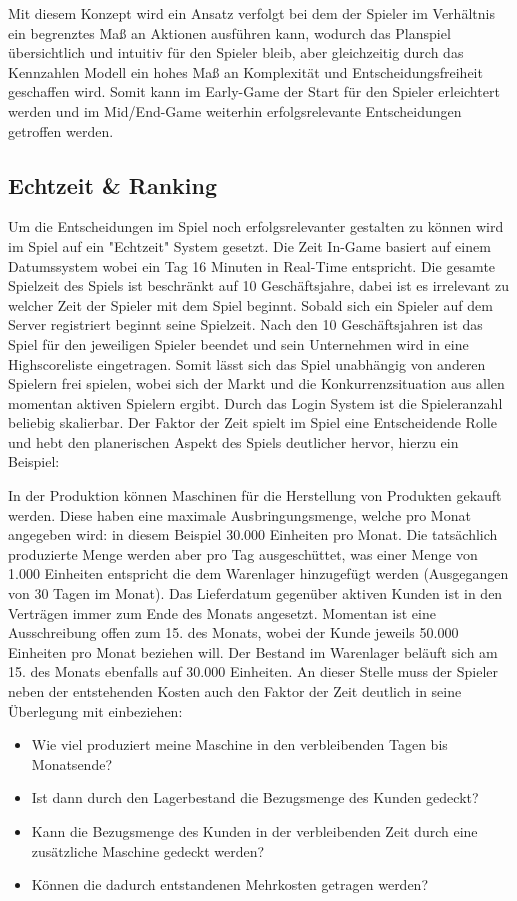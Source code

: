 \par Mit diesem Konzept wird ein Ansatz verfolgt bei dem der Spieler im Verhältnis ein begrenztes Maß an Aktionen ausführen kann, wodurch das Planspiel übersichtlich und intuitiv für den Spieler bleib, aber gleichzeitig durch das Kennzahlen Modell ein hohes Maß an Komplexität und Entscheidungsfreiheit geschaffen wird. Somit kann im Early-Game der Start für den Spieler erleichtert werden und im Mid/End-Game weiterhin erfolgsrelevante Entscheidungen getroffen werden.

\subsection{Echtzeit \& Ranking}
Um die Entscheidungen im Spiel noch erfolgsrelevanter gestalten zu können wird im Spiel auf ein "Echtzeit" System gesetzt. Die Zeit In-Game basiert auf einem Datumssystem wobei ein Tag 16 Minuten in Real-Time entspricht. Die gesamte Spielzeit des Spiels ist beschränkt auf 10 Geschäftsjahre, dabei ist es irrelevant zu welcher Zeit der Spieler mit dem Spiel beginnt. Sobald sich ein Spieler auf dem Server registriert beginnt seine Spielzeit. Nach den 10 Geschäftsjahren ist das Spiel für den jeweiligen Spieler beendet und sein Unternehmen wird in eine Highscoreliste eingetragen. Somit lässt sich das Spiel unabhängig von anderen Spielern frei spielen, wobei sich der Markt und die Konkurrenzsituation aus allen momentan aktiven Spielern ergibt. Durch das Login System ist die Spieleranzahl beliebig skalierbar. Der Faktor der Zeit spielt im Spiel eine Entscheidende Rolle und hebt den planerischen Aspekt des Spiels deutlicher hervor, hierzu ein Beispiel:
\par In der Produktion können Maschinen für die Herstellung von Produkten gekauft werden. Diese haben eine maximale Ausbringungsmenge, welche pro Monat angegeben wird: in diesem Beispiel 30.000 Einheiten pro Monat. Die tatsächlich produzierte Menge werden aber pro Tag ausgeschüttet, was einer Menge von 1.000 Einheiten entspricht die dem Warenlager hinzugefügt werden (Ausgegangen von 30 Tagen im Monat). Das Lieferdatum gegenüber aktiven Kunden ist in den Verträgen immer zum Ende des Monats angesetzt. Momentan ist eine Ausschreibung offen zum 15. des Monats, wobei der Kunde jeweils 50.000 Einheiten pro Monat beziehen will. Der Bestand im Warenlager beläuft sich am 15. des Monats ebenfalls auf 30.000 Einheiten. An dieser Stelle muss der Spieler neben der entstehenden Kosten auch den Faktor der Zeit deutlich in seine Überlegung mit einbeziehen:
\begin{itemize}
   \item Wie viel produziert meine Maschine in den verbleibenden Tagen bis Monatsende?
    \item Ist dann durch den Lagerbestand die Bezugsmenge des Kunden gedeckt?
    \item Kann die Bezugsmenge des Kunden in der verbleibenden Zeit durch eine zusätzliche Maschine gedeckt werden?
    \item Können die dadurch entstandenen Mehrkosten getragen werden?
\end{itemize}
